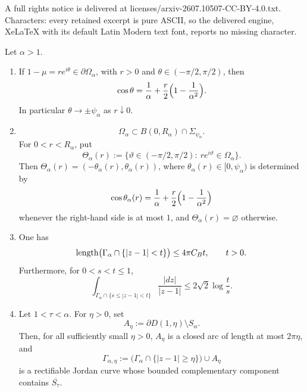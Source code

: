\documentclass[10pt,a4paper]{amsart}
\begin{document}
A full rights notice is delivered at licenses/arxiv-2607.10507-CC-BY-4.0.txt. Characters: every retained excerpt is pure ASCII, so the delivered engine, XeLaTeX with its default Latin Modern text font, reports no missing character.
\begin{lemma}\label{lem:geometry}
Let \(\alpha>1\).
\begin{enumerate}[label=\textnormal{(\roman*)}]
\item If \(1-\mu=r e^{i\theta}\in\partial\Omega_\alpha\), with
\(r>0\) and \(\theta\in(-\pi/2,\pi/2)\), then
\begin{equation}\label{eq:costheta}
        \cos\theta
        =
        \frac1\alpha+\frac r2\Bigl(1-\frac1{\alpha^2}\Bigr).
\end{equation}
In particular \(\theta\to\pm\psi_\alpha\) as \(r\downarrow0\).
\item
\[
        \Omega_\alpha\subset B(0,R_\alpha)\cap \Sigma_{\psi_\alpha}.
\]
For \(0<r<R_\alpha\), put
\[
        \Theta_\alpha(r)
        :=\{\vartheta\in(-\pi/2,\pi/2):\ r e^{i\vartheta}\in\Omega_\alpha\}.
\]
Then \(\Theta_\alpha(r)=(-\theta_\alpha(r),\theta_\alpha(r))\), where
\(\theta_\alpha(r)\in[0,\psi_\alpha)\) is determined by
\[
        \cos\theta_\alpha(r)
        =
        \frac1\alpha+\frac r2\Bigl(1-\frac1{\alpha^2}\Bigr)
\]
whenever the right-hand side is at most \(1\), and
\(\Theta_\alpha(r)=\varnothing\) otherwise.
\item 
One has
\begin{equation}\label{eq:Stolz-local-length-main}
        \operatorname{length}\bigl(\Gamma_\alpha\cap\{|z-1|<t\}\bigr)
        \le 4 \pi C_{\rm B}t,\qquad t>0.
\end{equation}
Furthermore, for \(0<s<t\le 1\),
\[
        \int_{\Gamma_\alpha\cap\{s\le |z-1|<t\}}
             \frac{|dz|}{|z-1|}
        \le 2\sqrt2 \log \frac{t}{s}.
\]
\item Let \(1<\tau<\alpha\). For \(\eta>0\), set
\[
        A_\eta:=\partial D(1,\eta)\setminus S_\alpha.
\]
Then, for all sufficiently small \(\eta>0\), \(A_\eta\) is a closed arc
of length at most \(2\pi\eta\), and
\begin{equation}\label{curve}
        \Gamma_{\alpha,\eta}
        :=
        \bigl(\Gamma_\alpha\cap\{|z-1|\ge\eta\}\bigr)\cup A_\eta
\end{equation}
is a rectifiable Jordan curve
whose bounded complementary component
contains \(\overline{S_\tau}\).


\end{enumerate}
\end{lemma}
\end{document}

